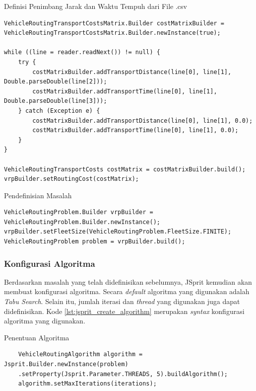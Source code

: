 \begin{listing}[!]
	\captionsetup{format=hang}
	\caption{Definisi Penimbang Jarak dan Waktu Tempuh dari File .csv}
	\label{lst:jsprit_define_route_weights}
	\begin{verbatim}
VehicleRoutingTransportCostsMatrix.Builder costMatrixBuilder = VehicleRoutingTransportCostsMatrix.Builder.newInstance(true);

while ((line = reader.readNext()) != null) {
	try {
		costMatrixBuilder.addTransportDistance(line[0], line[1], Double.parseDouble(line[2]));
		costMatrixBuilder.addTransportTime(line[0], line[1], Double.parseDouble(line[3]));
	} catch (Exception e) {
		costMatrixBuilder.addTransportDistance(line[0], line[1], 0.0);
		costMatrixBuilder.addTransportTime(line[0], line[1], 0.0);
	}
}

VehicleRoutingTransportCosts costMatrix = costMatrixBuilder.build();
vrpBuilder.setRoutingCost(costMatrix);
	\end{verbatim}
\end{listing}


\begin{listing}[!]
	\captionsetup{format=hang}
	\caption{Pendefinisian Masalah}
	\label{lst:jsprit_build_problem}
	\begin{verbatim}
VehicleRoutingProblem.Builder vrpBuilder = VehicleRoutingProblem.Builder.newInstance();
vrpBuilder.setFleetSize(VehicleRoutingProblem.FleetSize.FINITE);
VehicleRoutingProblem problem = vrpBuilder.build();
	\end{verbatim}
\end{listing}


\subsubsection{Konfigurasi Algoritma}
Berdasarkan masalah yang telah didefinisikan sebelumnya, JSprit kemudian akan membuat konfigurasi algoritma. Secara \textit{default} algoritma yang digunakan adalah \textit{Tabu Search}. Selain itu, jumlah iterasi dan \textit{thread} yang digunakan juga dapat didefinisikan. Kode \ref{lst:jsprit_create_algorithm} merupakan \textit{syntax} konfigurasi algoritma yang digunakan. 


\begin{listing}[!]
	\captionsetup{format=hang}
	\caption{Penentuan Algoritma}
	\label{lst:jsprit_create_algorithm}
	\begin{verbatim}
	VehicleRoutingAlgorithm algorithm = Jsprit.Builder.newInstance(problem)
	.setProperty(Jsprit.Parameter.THREADS, 5).buildAlgorithm();
	algorithm.setMaxIterations(iterations);
	\end{verbatim}
\end{listing}


